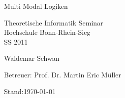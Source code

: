 
\begin{titlepage}
	
	\vspace*{2cm}
	
	\begin{center}
		\begin{Huge}
			Multi Modal Logiken
		\end{Huge}
	\end{center}
	
	\vspace*{2cm}
	
	\begin{center}
		\begin{Large}
			Theoretische Informatik Seminar\\
			Hochschule Bonn-Rhein-Sieg\\
			SS 2011
		\end{Large}			
	\end{center}

	\vspace*{4cm}
	
	\begin{center}
		\begin{Large}
			Waldemar Schwan  
		\end{Large}			
	\end{center}
	
	\vspace*{5cm}
	
	
	
	
	\begin{large}
		Betreuer: Prof. Dr. Martin Eric Müller 
	\end{large}
	
	\vspace*{1cm}
	Stand:\today
\end{titlepage}